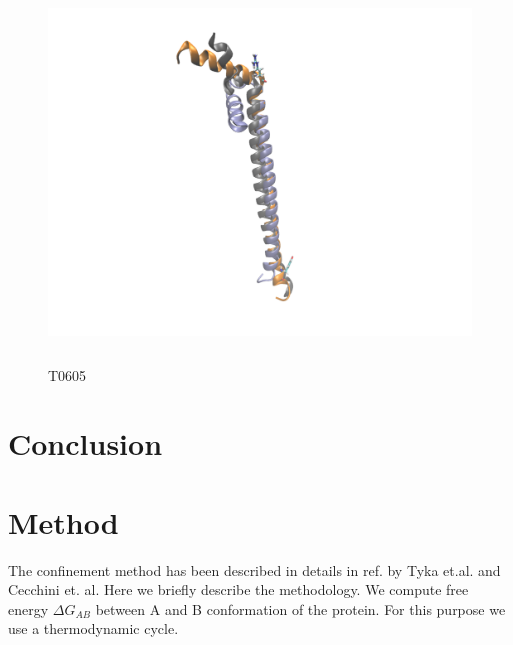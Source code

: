 \documentclass[12pt]{article}
\begin{document}
\begin{figure}
\begin{center}
\includegraphics[width=12cm,height=10cm]{T0605.pdf}
\end{center}
\caption{T0605}
\label{fig:T0605}
\end{figure}



\section{Conclusion}



\section{Method}

The confinement method has been described in details in ref. by Tyka et.al. and Cecchini et. al.
Here we briefly describe the methodology.  We compute free energy $\Delta G_{AB}$ between A and B
conformation of the protein. For this purpose we use a thermodynamic cycle.
\end{document}
